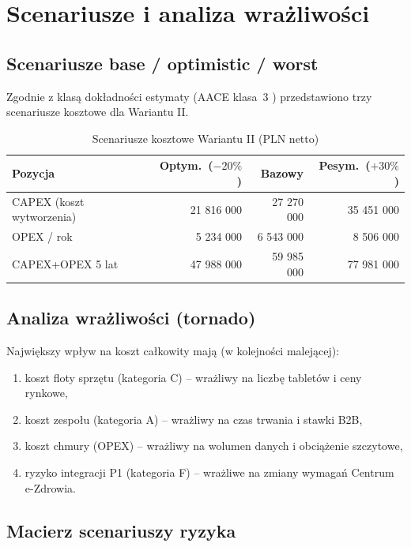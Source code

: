 \section{Scenariusze i analiza wrażliwości}

\subsection{Scenariusze base / optimistic / worst}

Zgodnie z klasą dokładności estymaty (AACE klasa~3 \cite{AACE_18R97}) przedstawiono trzy scenariusze kosztowe dla Wariantu II.

\begin{table}[h]
\centering
\small
\renewcommand{\arraystretch}{1.2}
\begin{tabular}{|L{5.5cm}|r|r|r|}
\hline
{}\textbf{Pozycja} & \textbf{Optym.~($-20\%$)} & \textbf{Bazowy} & \textbf{Pesym.~($+30\%$)} \\
\hline
CAPEX (koszt wytworzenia) & 21 816 000 & 27 270 000 & 35 451 000 \\
\hline
OPEX / rok & 5 234 000 & 6 543 000 & 8 506 000 \\
\hline
CAPEX+OPEX 5 lat & 47 988 000 & 59 985 000 & 77 981 000 \\
\hline
\end{tabular}
\caption{Scenariusze kosztowe Wariantu II (PLN netto)}
\label{tab:scenariusze}
\end{table}

\subsection{Analiza wrażliwości (tornado)}

Największy wpływ na koszt całkowity mają (w kolejności malejącej):

\begin{enumerate}
    \item koszt floty sprzętu (kategoria C) -- wrażliwy na liczbę tabletów i ceny rynkowe,
    \item koszt zespołu (kategoria A) -- wrażliwy na czas trwania i stawki B2B,
    \item koszt chmury (OPEX) -- wrażliwy na wolumen danych i obciążenie szczytowe,
    \item ryzyko integracji P1 (kategoria F) -- wrażliwe na zmiany wymagań Centrum e-Zdrowia.
\end{enumerate}

\subsection{Macierz scenariuszy ryzyka}

